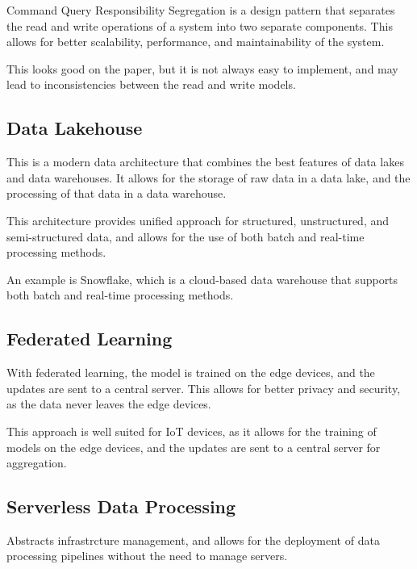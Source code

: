 Command Query Responsibility Segregation is a design pattern that separates the read and write operations of a system into two separate components. This allows for better scalability, performance, and maintainability of the system.

This looks good on the paper, but it is not always easy to implement, and may lead to inconsistencies between the read and write models.

\subsection{Data Lakehouse}

This is a modern data architecture that combines the best features of data lakes and data warehouses. It allows for the storage of raw data in a data lake, and the processing of that data in a data warehouse.

This architecture provides unified approach for structured, unstructured, and semi-structured data, and allows for the use of both batch and real-time processing methods.

An example is Snowflake, which is a cloud-based data warehouse that supports both batch and real-time processing methods.

\subsection{Federated Learning}

With federated learning, the model is trained on the edge devices, and the updates are sent to a central server. This allows for better privacy and security, as the data never leaves the edge devices.

This approach is well suited for IoT devices, as it allows for the training of models on the edge devices, and the updates are sent to a central server for aggregation.

\subsection{Serverless Data Processing}
Abstracts infrastrcture management, and allows for the deployment of data processing pipelines without the need to manage servers.